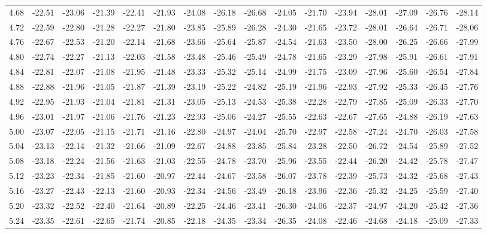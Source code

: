 \documentclass[floatfix,traditabstract,preprint2]{aa}
\begin{document}
\begin{table}
\begin{tabular}{c  c c c c c c c c c c c c c c c}
4.68 & -22.51 & -23.06 & -21.39 & -22.41 & -21.93 & -24.08 & -26.18 & -26.68 & -24.05 & -21.70 & -23.94 & -28.01 & -27.09 & -26.76 & -28.14\\
4.72 & -22.59 & -22.80 & -21.28 & -22.27 & -21.80 & -23.85 & -25.89 & -26.28 & -24.30 & -21.65 & -23.72 & -28.01 & -26.64 & -26.71 & -28.06\\
4.76 & -22.67 & -22.53 & -21.20 & -22.14 & -21.68 & -23.66 & -25.64 & -25.87 & -24.54 & -21.63 & -23.50 & -28.00 & -26.25 & -26.66 & -27.99\\
4.80 & -22.74 & -22.27 & -21.13 & -22.03 & -21.58 & -23.48 & -25.46 & -25.49 & -24.78 & -21.65 & -23.29 & -27.98 & -25.91 & -26.61 & -27.91\\
4.84 & -22.81 & -22.07 & -21.08 & -21.95 & -21.48 & -23.33 & -25.32 & -25.14 & -24.99 & -21.75 & -23.09 & -27.96 & -25.60 & -26.54 & -27.84\\
4.88 & -22.88 & -21.96 & -21.05 & -21.87 & -21.39 & -23.19 & -25.22 & -24.82 & -25.19 & -21.96 & -22.93 & -27.92 & -25.33 & -26.45 & -27.76\\
4.92 & -22.95 & -21.93 & -21.04 & -21.81 & -21.31 & -23.05 & -25.13 & -24.53 & -25.38 & -22.28 & -22.79 & -27.85 & -25.09 & -26.33 & -27.70\\
4.96 & -23.01 & -21.97 & -21.06 & -21.76 & -21.23 & -22.93 & -25.06 & -24.27 & -25.55 & -22.63 & -22.67 & -27.65 & -24.88 & -26.19 & -27.63\\
5.00 & -23.07 & -22.05 & -21.15 & -21.71 & -21.16 & -22.80 & -24.97 & -24.04 & -25.70 & -22.97 & -22.58 & -27.24 & -24.70 & -26.03 & -27.58\\
5.04 & -23.13 & -22.14 & -21.32 & -21.66 & -21.09 & -22.67 & -24.88 & -23.85 & -25.84 & -23.28 & -22.50 & -26.72 & -24.54 & -25.89 & -27.52\\
5.08 & -23.18 & -22.24 & -21.56 & -21.63 & -21.03 & -22.55 & -24.78 & -23.70 & -25.96 & -23.55 & -22.44 & -26.20 & -24.42 & -25.78 & -27.47\\
5.12 & -23.23 & -22.34 & -21.85 & -21.60 & -20.97 & -22.44 & -24.67 & -23.58 & -26.07 & -23.78 & -22.39 & -25.73 & -24.32 & -25.68 & -27.43\\
5.16 & -23.27 & -22.43 & -22.13 & -21.60 & -20.93 & -22.34 & -24.56 & -23.49 & -26.18 & -23.96 & -22.36 & -25.32 & -24.25 & -25.59 & -27.40\\
5.20 & -23.32 & -22.52 & -22.40 & -21.64 & -20.89 & -22.25 & -24.46 & -23.41 & -26.30 & -24.06 & -22.37 & -24.97 & -24.20 & -25.42 & -27.36\\
5.24 & -23.35 & -22.61 & -22.65 & -21.74 & -20.85 & -22.18 & -24.35 & -23.34 & -26.35 & -24.08 & -22.46 & -24.68 & -24.18 & -25.09 & -27.33\\

\end{tabular}
\end{table}
\end{document}
